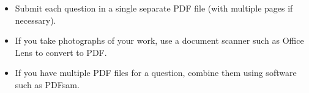 \documentclass{article}
\begin{document}
\vfill
\small
\begin{itemize}
	\item Submit each question in a single separate PDF file (with multiple pages if necessary).
	\item If you take photographs of your work, use a document scanner such as Office Lens to convert to PDF.
	\item If you have multiple PDF files for a question, combine them using software such as PDFsam.
\end{itemize}

\vfill
\centering
\small
\end{document}
